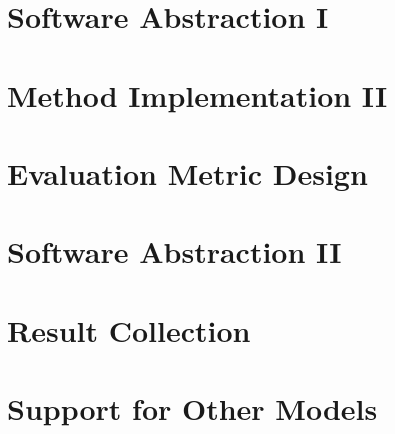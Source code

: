 \documentclass[main]{subfiles}
\begin{document}
\newpage
\section{Software Abstraction I}

\newpage
\section{Method Implementation II}

\newpage
\section{Evaluation Metric Design} \label{sec:metric}


\newpage
\section{Software Abstraction II}


\newpage
\section{Result Collection}


\newpage
\section{Support for Other Models}
\end{document}
